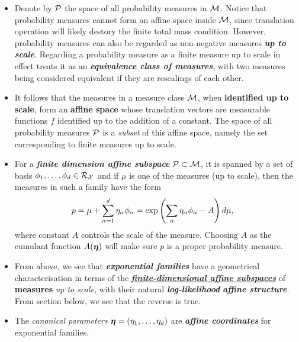 \documentclass[11pt]{article}
\begin{document}
\begin{itemize}
\item Denote by ${\mathcal P}$ the space of all probability measures in ${\mathcal M}$. Notice that probability measures cannot form an affine space inside ${\mathcal M}$, since translation operation will likely destory the finite total mass condition. However, probability measures can also be regarded as non-negative measures \emph{\textbf{up to scale}}.  Regarding a probability measure as a finite measure up to scale in effect treats it as an \emph{\textbf{equivalence class of measures}}, with two measures being considered equivalent if they are rescalings of each other.

\item It follows that the measures in a measure class ${\mathcal M}$, when \textbf{identified up to scale}, form an \textbf{affine space} whose translation vectors are measurable functions
$f$ identified up to the addition of a constant. The space of all probability measures ${\mathcal P}$ is a \emph{subset} of this affine space, namely the set corresponding to
finite measures up to scale.

\item For a \emph{\textbf{finite dimension affine subspace}} ${\mathcal P} \subset {\mathcal M}$, it is spanned by a set of basis $\phi_1, \ldots, \phi_d \in {\mathcal R}_{{\mathcal X}}$  and if $\mu$ is one of the measures (up to scale), then the measures in such a family have the form
\begin{align*}
p= \mu + \sum_{\alpha=1}^{d}\eta_{\alpha}\phi_{\alpha} &=\exp\left(\sum_{\alpha}\eta_{\alpha}\phi_{\alpha} -  A\right)d\mu,
\end{align*} where constant $A$ controls the scale of the measure. Choosing $A$ as the cumulant function $A(\boldsymbol{\eta})$ will make sure $p$ is a proper probability measure. %


\item From above, we see that \textbf{\emph{exponential families}} have a geometrical characterisation in terms
of the \textbf{\underline{\emph{finite-dimensional affine subspaces}}} of \textbf{measures} \emph{up to scale}, with their natural \emph{\textbf{log-likelihood}} \emph{\textbf{affine structure}}. From section below, we see that the reverse is true.

\item The \emph{canonical parameters} $\boldsymbol{\eta} = (\eta_1, \ldots, \eta_d)$ are \emph{\textbf{affine coordinates}} for exponential families.
\end{itemize}
\end{document}
